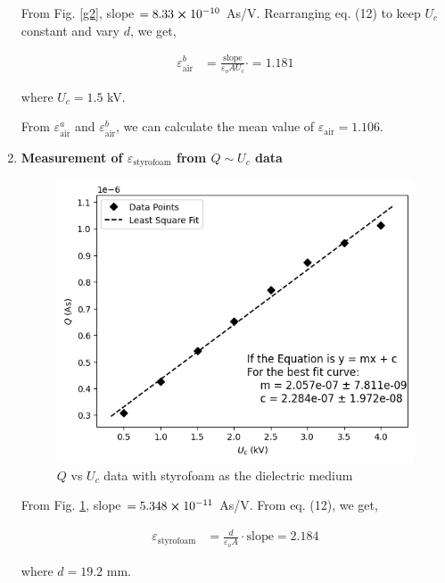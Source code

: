 \begin{enumerate}
            From Fig. \ref{g2}, slope $=8.33 \cross 10^{-10}$ As/V. Rearranging eq. (12) to keep $U_c$ constant and vary $d$, we get,
                
            \begin{align*}
                \varepsilon_\text{air}^{b} &= \frac{\text{slope}}{\varepsilon_oAU_c} \cdot =1.181
            \end{align*}
            
            where $U_c=1.5$ kV.

            From $\varepsilon_\text{air}^a$ and $\varepsilon_\text{air}^b$, we can calculate the mean value of $\varepsilon_\text{air}=1.106$.\\

        \item \textbf{Measurement of $\varepsilon_\text{styrofoam}$ from $Q \sim U_c$ data}
            \begin{figure}[H]
                \centering
                \includegraphics[width=0.8\columnwidth]{images/g3.png}
                \caption{$Q$ vs $U_c$ data with styrofoam as the dielectric medium}
                \label{g3}
            \end{figure}

            From Fig. \ref{g3}, slope $=5.348 \cross 10^{-11}$ As/V. From eq. (12), we get,
                
            \begin{align*}
                \varepsilon_\text{styrofoam} &= \frac{d}{\varepsilon_oA} \cdot \text{slope}=2.184
            \end{align*}
            
            where $d=19.2$ mm.\\


\end{enumerate}
